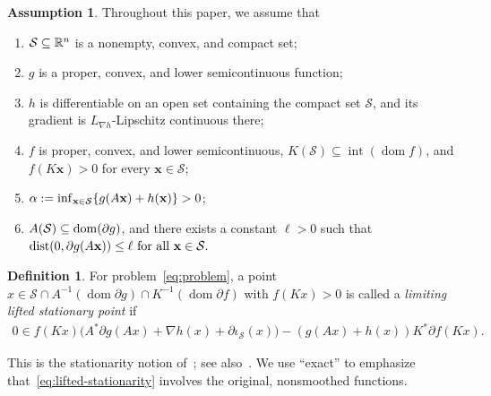 \documentclass[9pt]{article}
\numberwithin{equation}{section}
\theoremstyle{definition}
\newtheorem{assumption}[theorem]{Assumption}
\newtheorem{definition}[theorem]{Definition}
\theoremstyle{remark}
\newcommand{\Sset}{\mathcal S}
\newcommand{\h}[1]{\mathbf{#1}}
\DeclareMathOperator{\dom}{dom}
\begin{document}
\begin{assumption}\label{ass:standing}  Throughout this paper, we assume that
\begin{enumerate}[label=(\alph*),leftmargin=2.1em]
\item ${\cal S} \subseteq {\mathbb R}^n$ is a nonempty, convex, and compact set;
\item $g$ is a proper, convex, and lower semicontinuous function;
\item $h$ is differentiable on an open set containing
the compact set $\Sset$, and its gradient is $L_{\nabla h}$-Lipschitz
continuous there;
\item $f$ is proper, convex, and lower semicontinuous,
$K(\Sset)\subseteq\operatorname{int}(\dom f)$, and
$f(K\h x)>0$ for every $\h x\in\Sset$;
\item  $\alpha:=\inf_{\h x \in {\cal S}}\{g(A{\h x})+h({\h x})\}>0$;
\item  $A({\cal S}) \subseteq \dom (\partial g)$, and
 there exists a constant $\ell>0$ such that
$
{\rm dist}(0, \partial g(A \h x)) \le \ell \mbox{ for all } \h x  \in {\cal S}.
$
\end{enumerate}
\end{assumption}






\begin{definition}\label{def:stationarity}
For problem~\eqref{eq:problem}, a point
$x\in\Sset\cap A^{-1}(\dom\partial g)
\cap K^{-1}(\dom\partial f)
$
with \(f(Kx)>0\) is called a \emph{limiting lifted stationary point} if
\begin{eqnarray}\label{eq:lifted-stationarity}
0\in
f(Kx)
\bigl(
A^*\partial g(Ax)+\nabla h(x)+\partial\iota_{\mathcal S}(x)
\bigr)
-
(g(Ax)+h(x))K^*\partial f(Kx).
\end{eqnarray}
\end{definition}
This is the stationarity notion of~\cite[Definition~3.3]{BotLiTao2025}; see also~\cite[Definition~2.3]{Tao2026}. We use ``exact'' to emphasize that~\eqref{eq:lifted-stationarity} involves the original, nonsmoothed functions.
\end{document}
